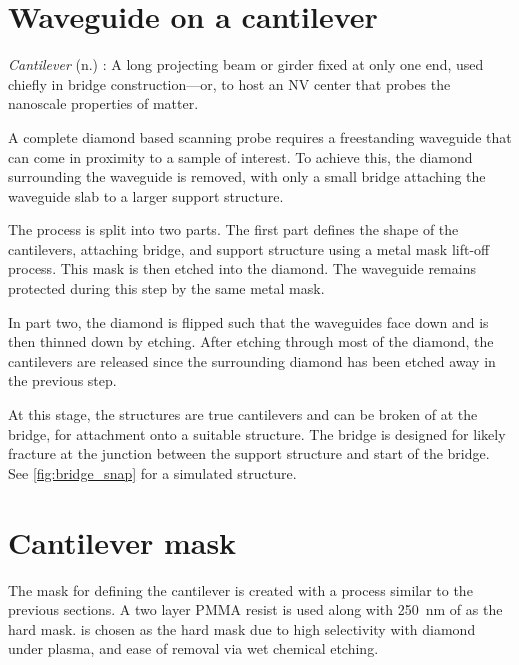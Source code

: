 \section{Waveguide on a cantilever}
\emph{Cantilever} (n.) : A long projecting beam or girder fixed at only one end, used chiefly in bridge construction—or, to host an \gls{NV} center that probes the nanoscale properties of matter.

A complete diamond based scanning probe requires a freestanding waveguide that can come in proximity to a sample of interest. To achieve this, the diamond surrounding the waveguide is removed, with only a small bridge attaching the waveguide slab to a larger support structure. 

The process is split into two parts. The first part defines the shape of the cantilevers, attaching bridge, and support structure using a metal mask lift-off process. This mask is then etched into the diamond. The waveguide remains protected during this step by the same metal mask.

In part two, the diamond is flipped such that the waveguides face down and is then thinned down by etching. After etching through most of the diamond, the cantilevers are released since the surrounding diamond has been etched away in the previous step. 

At this stage, the structures are true cantilevers and can be broken of at the bridge, for attachment onto a suitable structure. The bridge is designed for likely fracture at the junction between the support structure and start of the bridge. See \cref{fig:bridge_snap} for a simulated structure.

\section*{Cantilever mask}

The mask for defining the cantilever is created with a process similar to the previous sections. A two layer \gls{PMMA} resist is used along with \qty{250}{\nano\meter} of  as the hard mask.  is chosen as the hard mask due to high selectivity with diamond under  plasma, and ease of removal via wet chemical etching. 

